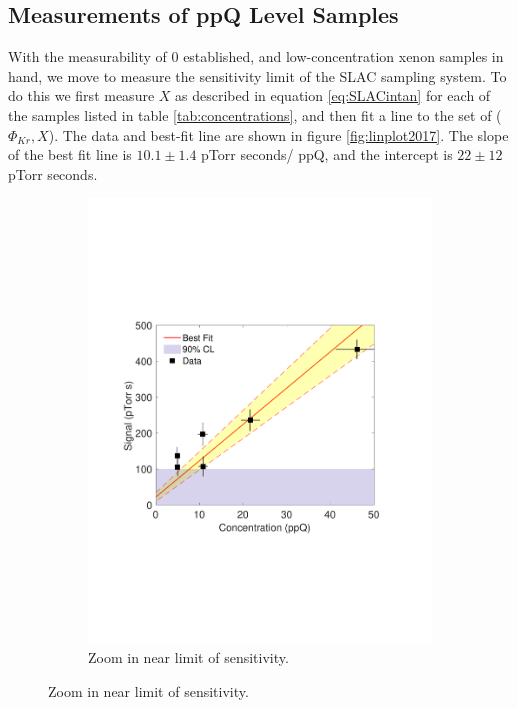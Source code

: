\documentclass[12pt]{article}
\begin{document}
\subsection{Measurements of ppQ Level Samples}
With the measurability of 0 established, and low-concentration xenon samples in hand, we move to measure the sensitivity limit of the SLAC sampling system. To do this we first measure $X$ as described in equation \ref{eq:SLACintan} for each of the samples listed in table \ref{tab:concentrations}, and then fit a line to the set of ($\Phi_{Kr},X$). The data and best-fit line are shown in figure \ref{fig:linplot2017}. The slope of the best fit line is $10.1 \pm 1.4$ pTorr seconds/ ppQ, and the intercept is $22 \pm 12$ pTorr seconds. 
\begin{figure}[h!]
\centering
\begin{subfigure}{0.5\textwidth}
  \centering
  \includegraphics[width=\textwidth]{Figures/SensPlot0217.pdf}
  \caption{Zoom in near limit of sensitivity.}
\end{subfigure}%

\end{figure}
\end{document}
